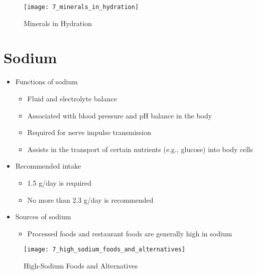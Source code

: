 \documentclass[title={Chapter 7}]{fdsn201notes}
\begin{document}
\begin{figure}[H]
	\centering
	\texttt{[image: 7\_minerals\_in\_hydration]}
	\caption{Minerals in Hydration}
	\label{fig:minerals_in_hydration}
\end{figure}

\section{Sodium}\label{sec:sodium}
\begin{itemize}
	\item Functions of sodium
	\begin{itemize}
		\item Fluid and electrolyte balance
		\item Associated with blood pressure and pH balance in the body
		\item Required for nerve impulse transmission
		\item Assists in the transport of certain nutrients (e.g., glucose) into body cells
	\end{itemize}
	\item Recommended intake
	\begin{itemize}
		\item 1.5 g/day is required
		\item No more than 2.3 g/day is recommended
	\end{itemize}
	\item Sources of sodium
	\begin{itemize}
		\item Processed foods and restaurant foods are generally high in sodium
	\end{itemize}
\end{itemize}

\begin{figure}[H]
	\centering
	\texttt{[image: 7\_high\_sodium\_foods\_and\_alternatives]}
	\caption{High-Sodium Foods and Alternatives}
	\label{fig:high_sodium_foods_and_alternatives}
\end{figure}
\end{document}
